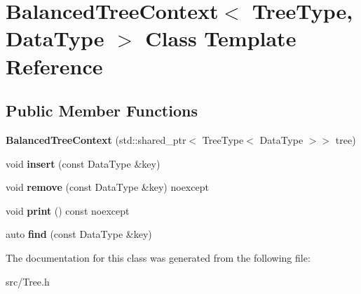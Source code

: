 \hypertarget{classBalancedTreeContext}{}\section{Balanced\+Tree\+Context$<$ Tree\+Type, Data\+Type $>$ Class Template Reference}
\label{classBalancedTreeContext}
\subsection*{Public Member Functions}
\begin{DoxyCompactItemize}
\item 
\mbox{\label{classBalancedTreeContext_a12a373eb9aecb45f69ad8966b5bb3b33}} 
{\bfseries Balanced\+Tree\+Context} (std\+::shared\+\_\+ptr$<$ Tree\+Type$<$ Data\+Type $>$$>$ tree)
\item 
\mbox{\label{classBalancedTreeContext_ade2008d8f07e21fe0ca1a945d76b1dfd}} 
void {\bfseries insert} (const Data\+Type \&key)
\item 
\mbox{\label{classBalancedTreeContext_a83ebaf1d3f3fd1f78f7aa3c9d6f01daf}} 
void {\bfseries remove} (const Data\+Type \&key) noexcept
\item 
\mbox{\label{classBalancedTreeContext_a1541969c675ff8c6672e250d8563715d}} 
void {\bfseries print} () const noexcept
\item 
\mbox{\label{classBalancedTreeContext_a6d619163f086eb4b62480ec7a991b900}} 
auto {\bfseries find} (const Data\+Type \&key)
\end{DoxyCompactItemize}


The documentation for this class was generated from the following file\+:\begin{DoxyCompactItemize}
\item 
src/Tree.\+h\end{DoxyCompactItemize}
